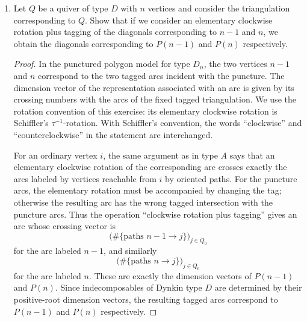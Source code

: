 \documentclass[11pt, a4paper]{article}
\newcommand{\vect}[1]{\mathbf{#1}}
\newcommand{\ddim}{\underline{\dim}}
\begin{document}
\begin{enumerate}[leftmargin=*, label=\textbf{\arabic*.}]
\begin{proof}
Let $X$ be the indecomposable representation with dimension vector
\[
\ddim X=(1,1,1,1,1)
\]
and with all nonzero arrow maps equal to the identity $k\to k$.
The given representation has $k^2$ at every vertex and each arrow map is the identity on $k^2$. Choose a basis $e_1,e_2$ of $k^2$ at every vertex. The subspaces spanned by $e_1$ at all vertices form a subrepresentation isomorphic to $X$, and the subspaces spanned by $e_2$ at all vertices form another subrepresentation isomorphic to $X$. Since the identity maps preserve this decomposition, we get
\[
M\cong X\oplus X.
\]
Thus the required decomposition is
\[
M\cong \vect{11111}\oplus\vect{11111}.
\]
\end{proof}

\item Let $Q$ be a quiver of type $D$ with $n$ vertices and consider the triangulation corresponding to $Q$. Show that if we consider an elementary clockwise rotation plus tagging of the diagonals corresponding to $n-1$ and $n$, we obtain the diagonals corresponding to $P(n-1)$ and $P(n)$ respectively.

\begin{proof}
In the punctured polygon model for type $D_n$, the two vertices $n-1$ and $n$ correspond to the two tagged arcs incident with the puncture. The dimension vector of the representation associated with an arc is given by its crossing numbers with the arcs of the fixed tagged triangulation. We use the rotation convention of this exercise: its elementary clockwise rotation is Schiffler's $\tau^{-1}$-rotation. With Schiffler's convention, the words ``clockwise'' and ``counterclockwise'' in the statement are interchanged.

For an ordinary vertex $i$, the same argument as in type $A$ says that an elementary clockwise rotation of the corresponding arc crosses exactly the arcs labeled by vertices reachable from $i$ by oriented paths. For the puncture arcs, the elementary rotation must be accompanied by changing the tag; otherwise the resulting arc has the wrong tagged intersection with the puncture arcs. Thus the operation ``clockwise rotation plus tagging'' gives an arc whose crossing vector is
\[
\bigl(\#\{\text{paths }n-1\to j\}\bigr)_{j\in Q_0}
\]
for the arc labeled $n-1$, and similarly
\[
\bigl(\#\{\text{paths }n\to j\}\bigr)_{j\in Q_0}
\]
for the arc labeled $n$.
These are exactly the dimension vectors of $P(n-1)$ and $P(n)$.
Since indecomposables of Dynkin type $D$ are determined by their positive-root dimension vectors, the resulting tagged arcs correspond to $P(n-1)$ and $P(n)$ respectively.
\end{proof}


\end{enumerate}
\end{document}
